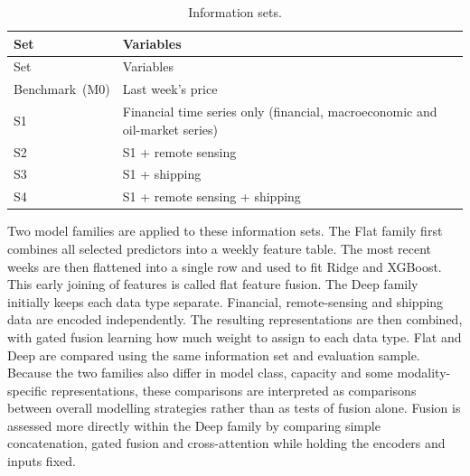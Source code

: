 \documentclass[
  british,
  12pt,
  oneside]{book}
\begin{document}
\begin{longtable}[]{@{}
  >{\raggedright\arraybackslash}p{}
  >{\raggedright\arraybackslash}p{}@{}}
\caption{\label{tab:info-sets} Information sets.}\tabularnewline
\toprule\noalign{}
\begin{minipage}[b]{\linewidth}\raggedright
Set
\end{minipage} & \begin{minipage}[b]{\linewidth}\raggedright
Variables
\end{minipage} \\
\midrule\noalign{}
\endfirsthead
\toprule\noalign{}
\begin{minipage}[b]{\linewidth}\raggedright
Set
\end{minipage} & \begin{minipage}[b]{\linewidth}\raggedright
Variables
\end{minipage} \\
\midrule\noalign{}
\endhead
\bottomrule\noalign{}
\endlastfoot
Benchmark~(M0) & Last week's price \\
S1 & Financial time series only (financial, macroeconomic and oil-market series) \\
S2 & S1 + remote sensing \\
S3 & S1 + shipping \\
S4 & S1 + remote sensing + shipping \\
\end{longtable}

Two model families are applied to these information sets. The Flat family first combines all selected predictors into a weekly feature table. The most recent weeks are then flattened into a single row and used to fit Ridge and XGBoost. This early joining of features is called flat feature fusion. The Deep family initially keeps each data type separate. Financial, remote-sensing and shipping data are encoded independently. The resulting representations are then combined, with gated fusion learning how much weight to assign to each data type. Flat and Deep are compared using the same information set and evaluation sample. Because the two families also differ in model class, capacity and some modality-specific representations, these comparisons are interpreted as comparisons between overall modelling strategies rather than as tests of fusion alone. Fusion is assessed more directly within the Deep family by comparing simple concatenation, gated fusion and cross-attention while holding the encoders and inputs fixed.
\end{document}
